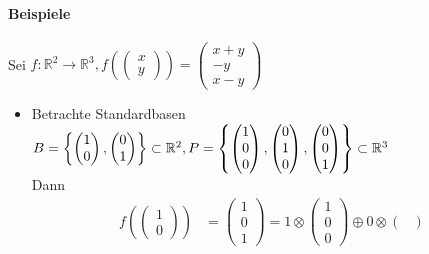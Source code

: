 \documentclass[a5paper, 10pt]{book}
\newcommand{\circleplus}{\oplus}%
\newcommand{\circlecdot}{\otimes}%
\begin{document}
				\paragraph{Beispiele}
					Sei $f: \mathbb{R}^2 \to \mathbb{R}^3, f\left(\begin{pmatrix}
						x \\ y
					\end{pmatrix}\right) = \begin{pmatrix}
					x+y \\ -y \\ x-y
					\end{pmatrix}$
					\begin{itemize}
						\item Betrachte Standardbasen $B = \left\{ \begin{pmatrix} 1 \\ 0 \end{pmatrix}, \begin{pmatrix} 0 \\ 1 \end{pmatrix} \right\} \subset \mathbb{R}^2,\\
						P = \left\{ \begin{pmatrix} 1 \\ 0 \\ 0 \end{pmatrix}, \begin{pmatrix} 0 \\ 1 \\ 0 \end{pmatrix}, \begin{pmatrix} 0 \\ 0 \\ 1 \end{pmatrix} \right\} \subset \mathbb{R}^3$\\
						Dann
						\begin{align}
							f\left( \begin{pmatrix}
								1 \\ 0
							\end{pmatrix}  \right) &= \begin{pmatrix}
								1 \\ 0 \\ 1
							\end{pmatrix} = 1 \circlecdot \begin{pmatrix}
								1 \\ 0 \\ 0
							\end{pmatrix} \circleplus 0 \circlecdot \begin{pmatrix}

\end{pmatrix}
\end{align}
\end{itemize}
\end{document}
